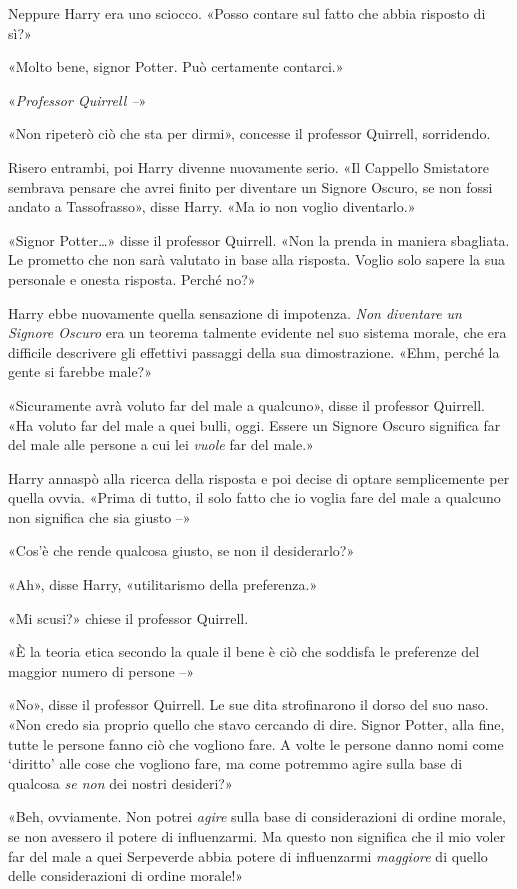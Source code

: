 Neppure Harry era uno sciocco. «Posso contare sul fatto che abbia risposto di sì?»

«Molto bene, signor Potter. Può certamente contarci.»

«\textit{Professor Quirrell –}»

«Non ripeterò ciò che sta per dirmi», concesse il professor Quirrell, sorridendo.

Risero entrambi, poi Harry divenne nuovamente serio. «Il Cappello Smistatore sembrava pensare che avrei finito per diventare un Signore Oscuro, se non fossi andato a Tassofrasso», disse Harry. «Ma io non voglio diventarlo.»

«Signor Potter…» disse il professor Quirrell. «Non la prenda in maniera sbagliata. Le prometto che non sarà valutato in base alla risposta. Voglio solo sapere la sua personale e onesta risposta. Perché no?»

Harry ebbe nuovamente quella sensazione di impotenza. \textit{Non diventare un Signore Oscuro} era un teorema talmente evidente nel suo sistema morale, che era difficile descrivere gli effettivi passaggi della sua dimostrazione. «Ehm, perché la gente si farebbe male?»

«Sicuramente avrà voluto far del male a qualcuno», disse il professor Quirrell. «Ha voluto far del male a quei bulli, oggi. Essere un Signore Oscuro significa far del male alle persone a cui lei \textit{vuole} far del male.»

Harry annaspò alla ricerca della risposta e poi decise di optare semplicemente per quella ovvia. «Prima di tutto, il solo fatto che io voglia fare del male a qualcuno non significa che sia giusto –»

«Cos’è che rende qualcosa giusto, se non il desiderarlo?»

«Ah», disse Harry, «utilitarismo della preferenza.»

«Mi scusi?» chiese il professor Quirrell.

«È la teoria etica secondo la quale il bene è ciò che soddisfa le preferenze del maggior numero di persone –»

«No», disse il professor Quirrell. Le sue dita strofinarono il dorso del suo naso. «Non credo sia proprio quello che stavo cercando di dire. Signor Potter, alla fine, tutte le persone fanno ciò che vogliono fare. A volte le persone danno nomi come ‘diritto’ alle cose che vogliono fare, ma come potremmo agire sulla base di qualcosa \textit{se non} dei nostri desideri?»

«Beh, ovviamente. Non potrei \textit{agire} sulla base di considerazioni di ordine morale, se non avessero il potere di influenzarmi. Ma questo non significa che il mio voler far del male a quei Serpeverde abbia potere di influenzarmi \textit{maggiore} di quello delle considerazioni di ordine morale!»

